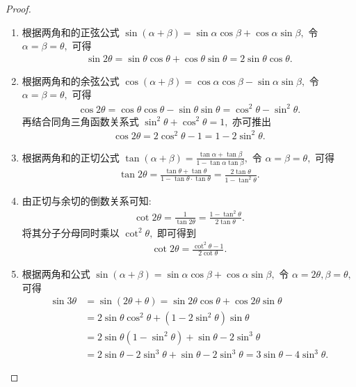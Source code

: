 \documentclass[../../main.tex]{subfiles}%
\begin{document}
\begin{proof}
\begin{enumerate}[(1)]
\item 根据两角和的正弦公式 $\sin(\alpha+\beta) = \sin\alpha\cos\beta + \cos\alpha\sin\beta,$ 令 $\alpha = \beta = \theta,$ 可得
\begin{align*}
\sin 2\theta = \sin\theta\cos\theta + \cos\theta\sin\theta = 2\sin\theta\cos\theta.
\end{align*}
\item 根据两角和的余弦公式 $\cos(\alpha+\beta) = \cos\alpha\cos\beta - \sin\alpha\sin\beta,$ 令 $\alpha = \beta = \theta,$ 可得
\begin{align*}
\cos 2\theta = \cos\theta\cos\theta - \sin\theta\sin\theta = \cos^2\theta - \sin^2\theta.
\end{align*}
再结合同角三角函数关系式 $\sin^2\theta+\cos^2\theta=1,$ 亦可推出
\begin{align*}
\cos 2\theta = 2\cos^2\theta - 1 = 1 - 2\sin^2\theta.
\end{align*}
\item 根据两角和的正切公式 $\tan(\alpha+\beta) = \frac{\tan\alpha + \tan\beta}{1-\tan\alpha\tan\beta},$ 令 $\alpha = \beta = \theta,$ 可得
\begin{align*}
\tan 2\theta = \frac{\tan\theta + \tan\theta}{1 - \tan\theta\cdot\tan\theta} = \frac{2\tan\theta}{1-\tan^2\theta}.
\end{align*}
\item 由正切与余切的倒数关系可知:
\begin{align*}
\cot 2\theta = \frac{1}{\tan 2\theta} = \frac{1 - \tan^2\theta}{2\tan\theta}.
\end{align*}
将其分子分母同时乘以 $\cot^2\theta,$ 即可得到
\begin{align*}
\cot 2\theta = \frac{\cot^2\theta - 1}{2\cot\theta}.
\end{align*}
\item 根据两角和公式 \(\sin(\alpha+\beta) = \sin\alpha\cos\beta+\cos\alpha\sin\beta,\) 令 $\alpha=2\theta, \beta=\theta,$ 可得
\begin{align*}
\sin 3\theta &= \sin(2\theta+\theta) = \sin 2\theta\cos\theta + \cos 2\theta\sin\theta \\
&= 2\sin\theta\cos^2\theta + (1-2\sin^2\theta)\sin\theta \\
&= 2\sin\theta(1-\sin^2\theta) + \sin\theta - 2\sin^3\theta \\
&= 2\sin\theta - 2\sin^3\theta + \sin\theta - 2\sin^3\theta = 3\sin\theta - 4\sin^3\theta.
\end{align*}

\end{enumerate}
\end{proof}
\end{document}
